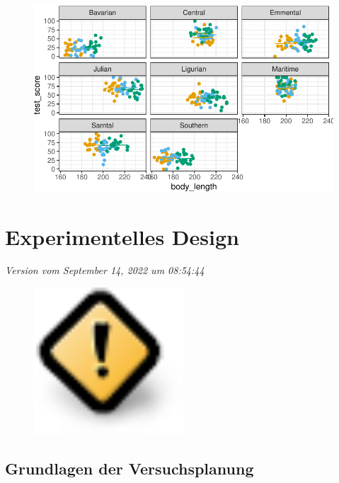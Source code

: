 \documentclass[
  letterpaper,
]{scrbook}
\begin{document}
\begin{figure}[H]

{\centering \includegraphics{./stat-modeling-mixed_files/figure-pdf/unnamed-chunk-18-1.pdf}

}

\end{figure}

\part{Experimentelles Design}

\emph{Version vom September 14, 2022 um 08:54:44}

\begin{figure}

{\centering \includegraphics[width=0.5\textwidth,height=\textheight]{./images/caution.png}

}

\end{figure}

\hypertarget{grundlagen-der-versuchsplanung}{%
\chapter{Grundlagen der
Versuchsplanung}\label{grundlagen-der-versuchsplanung}}
\end{document}
